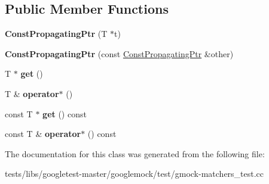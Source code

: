 \subsection*{Public Member Functions}
\begin{DoxyCompactItemize}
\item 
\mbox{\label{classtesting_1_1gmock__matchers__test_1_1ConstPropagatingPtr_a06da70663daa274fb8ca3352f039d609}} 
{\bfseries Const\+Propagating\+Ptr} (T $\ast$t)
\item 
\mbox{\label{classtesting_1_1gmock__matchers__test_1_1ConstPropagatingPtr_ae7620c62ba340603968896d5d5400ed1}} 
{\bfseries Const\+Propagating\+Ptr} (const \hyperlink{classtesting_1_1gmock__matchers__test_1_1ConstPropagatingPtr}{Const\+Propagating\+Ptr} \&other)
\item 
\mbox{\label{classtesting_1_1gmock__matchers__test_1_1ConstPropagatingPtr_a39a09d46453380ec1b8be8ce40adc453}} 
T $\ast$ {\bfseries get} ()
\item 
\mbox{\label{classtesting_1_1gmock__matchers__test_1_1ConstPropagatingPtr_ad77bbeaa18f84cbd6f3dc7021904f1e3}} 
T \& {\bfseries operator$\ast$} ()
\item 
\mbox{\label{classtesting_1_1gmock__matchers__test_1_1ConstPropagatingPtr_a92d7c8429246ef33a020e8a3d840b9c3}} 
const T $\ast$ {\bfseries get} () const
\item 
\mbox{\label{classtesting_1_1gmock__matchers__test_1_1ConstPropagatingPtr_aad99a528754294ab397378034686ae3a}} 
const T \& {\bfseries operator$\ast$} () const
\end{DoxyCompactItemize}


The documentation for this class was generated from the following file\+:\begin{DoxyCompactItemize}
\item 
tests/libs/googletest-\/master/googlemock/test/gmock-\/matchers\+\_\+test.\+cc\end{DoxyCompactItemize}
